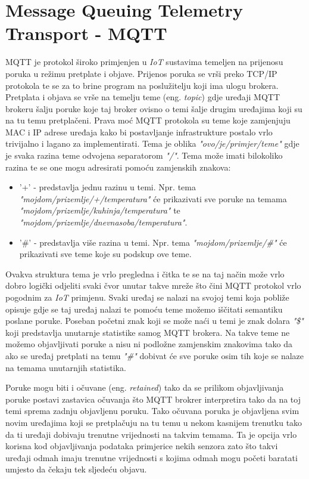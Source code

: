 \documentclass[times, utf8, zavrsni]{fer}
\begin{document}
\section{Message Queuing Telemetry Transport - \textbf{MQTT}}
MQTT je protokol široko primjenjen u \textit{IoT} sustavima temeljen na prijenosu poruka u režimu pretplate i objave.
Prijenos poruka se vrši preko TCP/IP protokola te se za to brine program na poslužitelju koji ima ulogu brokera.
Pretplata i objava se vrše na temelju teme (eng. \textit{topic}) gdje uređaji MQTT brokeru šalju poruke koje taj broker ovisno o temi šalje drugim uređajima koji su na tu temu pretplačeni.
Prava moć MQTT protokola su teme koje zamjenjuju MAC i IP adrese uređaja kako bi postavljanje infrastrukture postalo vrlo trivijalno i lagano za implementirati.
Tema je oblika \textit{"ovo/je/primjer/teme"} gdje je svaka razina teme odvojena separatorom \textit{"/"}.
Tema može imati bilokoliko razina te se one mogu adresirati pomoću zamjenskih znakova:
\begin{itemize}
    \item '+' - predstavlja jednu razinu u temi. Npr. tema \textit{"mojdom/prizemlje/+/temperatura"} će prikazivati sve poruke na temama \textit{"mojdom/prizemlje/kuhinja/temperatura"} te \textit{"mojdom/prizemlje/dnevnasoba/temperatura"}.
    \item '\#' - predstavlja više razina u temi. Npr. tema \textit{"mojdom/prizemlje/\#"} će prikazivati sve teme koje su podskup ove teme.
\end{itemize}
Ovakva struktura tema je vrlo pregledna i čitka te se na taj način može vrlo dobro logički odjeliti svaki čvor unutar takve mreže što čini MQTT protokol vrlo pogodnim za \textit{IoT} primjenu.
Svaki uređaj se nalazi na svojoj temi koja pobliže opisuje gdje se taj uređaj nalazi te pomoću teme možemo iščitati semantiku poslane poruke.
Poseban početni znak koji se može naći u temi je znak dolara \textit{"\$"} koji predstavlja unutarnje statistike samog MQTT brokera.
Na takve teme ne možemo objavljivati poruke a nisu ni podložne zamjenskim znakovima tako da ako se uređaj pretplati na temu \textit{"\#"} dobivat će sve poruke osim tih koje se nalaze na temama unutarnjih statistika.

Poruke mogu biti i očuvane (eng. \textit{retained}) tako da se prilikom objavljivanja poruke postavi zastavica očuvanja što MQTT brokrer interpretira tako da na toj temi sprema zadnju objavljenu poruku.
Tako očuvana poruka je objavljena svim novim uređajima koji se pretplačuju na tu temu u nekom kasnijem trenutku tako da ti uređaji dobivaju trenutne vrijednosti na takvim temama.
Ta je opcija vrlo korisna kod objavljivanja podataka primjerice nekih senzora zato što takvi uređaji odmah imaju trenutne vrijednosti s kojima odmah mogu početi baratati umjesto da čekaju tek sljedeću objavu.
\end{document}
